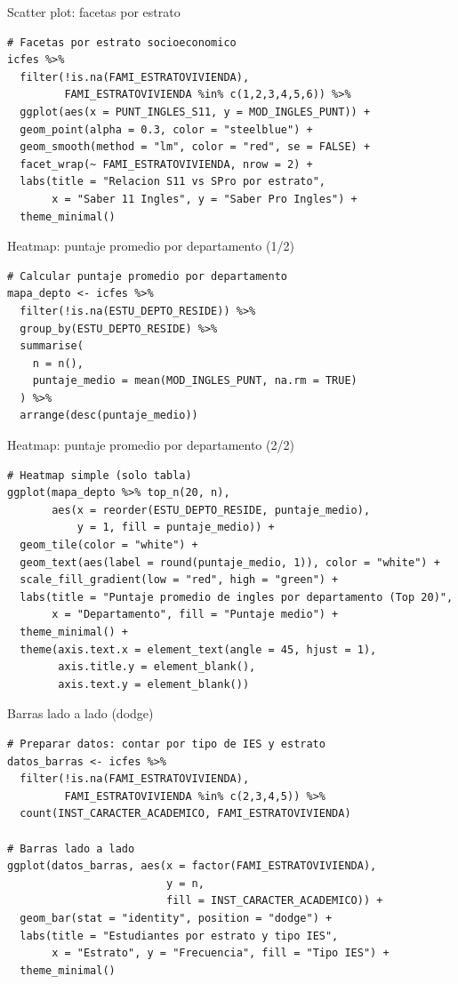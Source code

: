 \documentclass[aspectratio=169, 11pt]{beamer}
\begin{document}
\begin{frame}[fragile]{Scatter plot: facetas por estrato}
\begin{lstlisting}
# Facetas por estrato socioeconomico
icfes %>%
  filter(!is.na(FAMI_ESTRATOVIVIENDA),
         FAMI_ESTRATOVIVIENDA %in% c(1,2,3,4,5,6)) %>%
  ggplot(aes(x = PUNT_INGLES_S11, y = MOD_INGLES_PUNT)) +
  geom_point(alpha = 0.3, color = "steelblue") +
  geom_smooth(method = "lm", color = "red", se = FALSE) +
  facet_wrap(~ FAMI_ESTRATOVIVIENDA, nrow = 2) +
  labs(title = "Relacion S11 vs SPro por estrato",
       x = "Saber 11 Ingles", y = "Saber Pro Ingles") +
  theme_minimal()
\end{lstlisting}
\end{frame}

\begin{frame}[fragile]{Heatmap: puntaje promedio por departamento (1/2)}
\begin{lstlisting}
# Calcular puntaje promedio por departamento
mapa_depto <- icfes %>%
  filter(!is.na(ESTU_DEPTO_RESIDE)) %>%
  group_by(ESTU_DEPTO_RESIDE) %>%
  summarise(
    n = n(),
    puntaje_medio = mean(MOD_INGLES_PUNT, na.rm = TRUE)
  ) %>%
  arrange(desc(puntaje_medio))
\end{lstlisting}
\end{frame}

\begin{frame}[fragile]{Heatmap: puntaje promedio por departamento (2/2)}
\begin{lstlisting}
# Heatmap simple (solo tabla)
ggplot(mapa_depto %>% top_n(20, n),
       aes(x = reorder(ESTU_DEPTO_RESIDE, puntaje_medio),
           y = 1, fill = puntaje_medio)) +
  geom_tile(color = "white") +
  geom_text(aes(label = round(puntaje_medio, 1)), color = "white") +
  scale_fill_gradient(low = "red", high = "green") +
  labs(title = "Puntaje promedio de ingles por departamento (Top 20)",
       x = "Departamento", fill = "Puntaje medio") +
  theme_minimal() +
  theme(axis.text.x = element_text(angle = 45, hjust = 1),
        axis.title.y = element_blank(),
        axis.text.y = element_blank())
\end{lstlisting}
\end{frame}

\begin{frame}[fragile]{Barras lado a lado (dodge)}
\begin{lstlisting}
# Preparar datos: contar por tipo de IES y estrato
datos_barras <- icfes %>%
  filter(!is.na(FAMI_ESTRATOVIVIENDA),
         FAMI_ESTRATOVIVIENDA %in% c(2,3,4,5)) %>%
  count(INST_CARACTER_ACADEMICO, FAMI_ESTRATOVIVIENDA)

# Barras lado a lado
ggplot(datos_barras, aes(x = factor(FAMI_ESTRATOVIVIENDA),
                         y = n,
                         fill = INST_CARACTER_ACADEMICO)) +
  geom_bar(stat = "identity", position = "dodge") +
  labs(title = "Estudiantes por estrato y tipo IES",
       x = "Estrato", y = "Frecuencia", fill = "Tipo IES") +
  theme_minimal()
\end{lstlisting}
\end{frame}
\end{document}
